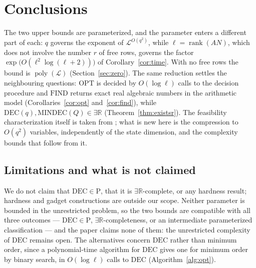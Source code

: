 \documentclass[journal]{IEEEtran}
\theoremstyle{plainn}
\theoremstyle{remark}
\begin{document}
\section{Conclusions}\label{sec:conclusions}

The two upper bounds are parameterized, and the parameter enters a different part of each: $q$
governs the exponent of $\mathcal L^{O(q^2)}$, while $\ell=\operatorname{rank}(AN)$, which does not
involve the number $r$ of free rows, governs the factor
$\exp\bigl(O(\ell^2\log(\ell+2))\bigr)$ of Corollary~\ref{cor:time}. With no free rows the bound is
$\operatorname{poly}(\mathcal L)$ (Section~\ref{sec:zero}). The same reduction settles the
neighbouring questions: $\mathrm{OPT}$ is decided by $O(\log\ell)$ calls to the decision procedure
and $\mathrm{FIND}$ returns exact real algebraic numbers in the arithmetic model
(Corollaries~\ref{cor:opt} and~\ref{cor:find}), while
$\mathrm{DEC}(q),\mathrm{MINDEC}(Q)\in\exists\mathbb R$ (Theorem~\ref{thm:existsr}).
The feasibility characterization itself is taken from \cite{fer10,dar25,fer26a,fer26b}; what is new here is the compression to $O(q^2)$ variables, independently of the state dimension, and the complexity bounds that follow from it.

\subsection{Limitations and what is not claimed}\label{sec:limits}

We do not claim that $\mathrm{DEC}\in\mathrm P$, that it is $\exists\mathbb R$-complete, or any
hardness result; hardness and gadget constructions are outside our scope. Neither parameter is
bounded in the unrestricted problem, so the two bounds are compatible with all three outcomes ---
$\mathrm{DEC}\in\mathrm P$, $\exists\mathbb R$-completeness, or an intermediate parameterized
classification --- and the paper claims none of them: the unrestricted complexity of $\mathrm{DEC}$
remains open. The alternatives concern $\mathrm{DEC}$ rather than minimum order, since a
polynomial-time algorithm for $\mathrm{DEC}$ gives one for minimum order by binary search, in
$O(\log\ell)$ calls to $\mathrm{DEC}$ (Algorithm~\ref{alg:opt}).
\end{document}
